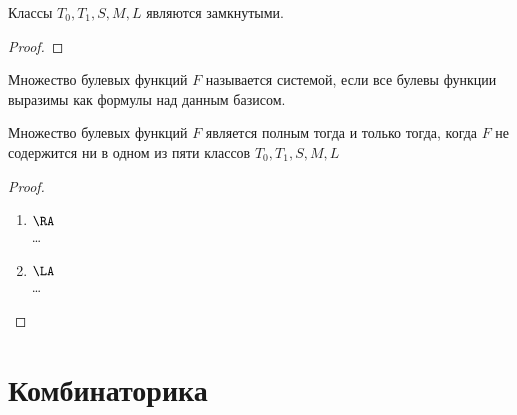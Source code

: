 \documentclass[a4paper, 14pt]{article}
\begin{document}
    \begin{theorem}
        Классы $T_0, T_1, S, M, L$ являются замкнутыми.
    \end{theorem}
    \begin{proof}[Proof]
        
    \end{proof}

    \begin{definition}
        Множество булевых функций $F$ называется { системой},
        если все булевы функции выразимы как формулы над данным базисом.
    \end{definition}

    \begin{theorem}
        Множество булевых функций $F$ является полным тогда и только
        тогда, когда $F$ не содержится ни в одном из пяти классов
        $T_0, T_1, S, M, L$
    \end{theorem}
    \begin{proof}
        \begin{enumerate}
            \item $\RA$ \\
            \dots
            \item $\LA$ \\
            \dots
        \end{enumerate}
    \end{proof}

    \section{Комбинаторика}
\end{document}
